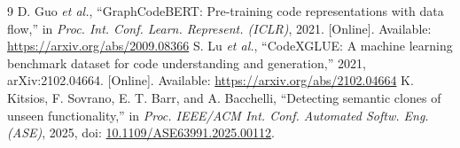 \documentclass[conference]{IEEEtran}
\begin{document}
\newpage
\balance
\begin{thebibliography}{9}
 D. Guo \emph{et al.},
``GraphCodeBERT: Pre-training code representations with data flow,''
in \emph{Proc. Int. Conf. Learn. Represent. (ICLR)}, 2021.
[Online]. Available: \url{https://arxiv.org/abs/2009.08366}
 S. Lu \emph{et al.},
``CodeXGLUE: A machine learning benchmark dataset for code understanding
and generation,'' 2021, arXiv:2102.04664.
[Online]. Available: \url{https://arxiv.org/abs/2102.04664}
 K. Kitsios, F. Sovrano, E. T. Barr, and A. Bacchelli,
``Detecting semantic clones of unseen functionality,''
in \emph{Proc. IEEE/ACM Int. Conf. Automated Softw. Eng. (ASE)},
2025, doi: \href{https://doi.org/10.1109/ASE63991.2025.00112}{10.1109/ASE63991.2025.00112}.
\end{thebibliography}
\end{document}
